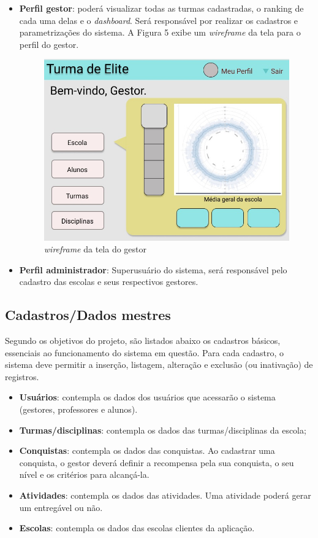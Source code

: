 \begin{itemize}
\item \textbf{Perfil gestor}: poderá visualizar todas as turmas cadastradas, o ranking de cada uma delas e o \textit{\gls{dashboard}}. Será responsável por realizar os cadastros e parametrizações do sistema. A Figura 5 exibe um \textit{\gls{wireframe}} da tela para o perfil do gestor.

\begin{figure}[htb]
    \centering
	\includegraphics[width=11cm]{imagens/tela-gestor.jpeg}
	\caption{\textit{\gls{wireframe}} da tela do gestor}
\end{figure}
\FloatBarrier

\item \textbf{Perfil administrador}: Superusuário do sistema, será responsável pelo cadastro das escolas e seus respectivos gestores.
\end{itemize}


\subsection{Cadastros/Dados mestres}
Segundo os objetivos do projeto, são listados abaixo os cadastros básicos, essenciais ao funcionamento do sistema em questão. Para cada cadastro, o sistema deve permitir a inserção, listagem, alteração e exclusão (ou inativação) de registros. 
\begin{itemize}
\item \textbf{Usuários}: contempla os dados dos usuários que acessarão o sistema (gestores, professores e alunos).
\item \textbf{Turmas/disciplinas}: contempla os dados das turmas/disciplinas da escola;
\item \textbf{Conquistas}: contempla os dados das conquistas. Ao cadastrar uma conquista, o gestor deverá definir a recompensa pela sua conquista, o seu nível e os critérios para alcançá-la.
\item \textbf{Atividades}: contempla os dados das atividades. Uma atividade poderá gerar um entregável ou não.
\item \textbf{Escolas}: contempla os dados das escolas clientes da aplicação.
\end{itemize}


